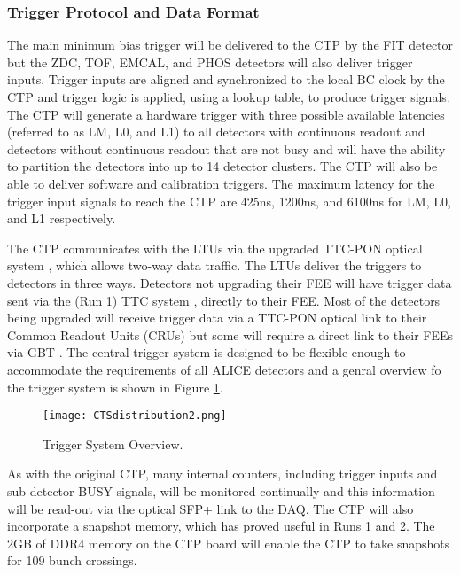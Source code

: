 \subsubsection{Trigger Protocol and Data Format}
The main minimum bias trigger will be delivered to the CTP by the FIT detector but the ZDC, TOF, EMCAL, and PHOS detectors will also deliver trigger inputs. Trigger inputs are aligned and synchronized to the local BC clock by the CTP and trigger logic is applied, using a lookup table, to produce trigger signals. The CTP will generate a hardware trigger with three possible available latencies (referred to as LM, L0, and L1) to all detectors with continuous readout and detectors without continuous readout that are not busy and will have the ability to partition the detectors into up to 14 detector clusters. The CTP will also be able to deliver software and calibration triggers. The maximum latency for the trigger input signals to reach the CTP are 425ns, 1200ns, and 6100ns for LM, L0, and L1 respectively.

The CTP communicates with the LTUs via the upgraded TTC-PON optical system \cite{Mendes:2017aok}, which allows two-way data traffic. The LTUs deliver the triggers to detectors in three ways. Detectors not upgrading their FEE will have trigger data sent via the (Run 1) TTC system \cite{Taylor:592719}, directly to their FEE. Most of the detectors being upgraded will receive trigger data via a TTC-PON optical link to their Common Readout Units (CRUs) but some will require a direct link to their FEEs via GBT \cite{Baron:1236361}. The central trigger system is designed to be flexible enough to accommodate the requirements of all ALICE detectors and a genral overview fo the trigger system is shown in Figure \ref{fig:systemoverview}.
\begin{figure}
\centering
\texttt{[image: CTSdistribution2.png]}
\caption{\label{fig:systemoverview} Trigger System Overview. }
\end{figure}


As with the original CTP, many internal counters, including trigger inputs and sub-detector BUSY signals, will be monitored continually and this information will be read-out via the optical SFP+ link to the DAQ. The CTP will also incorporate a snapshot memory, which has proved useful in Runs 1 and 2. The 2GB of DDR4 memory on the CTP board will enable the CTP to take snapshots for 109 bunch crossings.  


